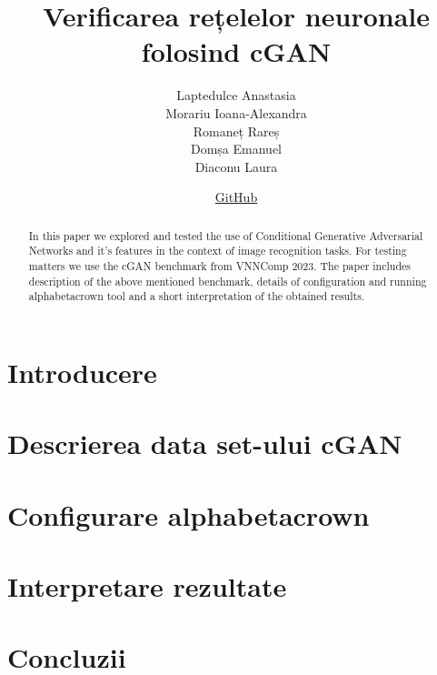\documentclass[12pt,a4paper]{report}
\title{Verificarea rețelelor neuronale folosind cGAN}
\author{Laptedulce Anastasia \\ Morariu Ioana-Alexandra \\ Romaneț Rareș  \\ Domșa Emanuel \\ Diaconu Laura}
\date{\href{https://github.com/IoanaMorariu/verificare_formala}{GitHub}}
\begin{document}
\maketitle
\begin{abstract}
\hspace{0.5 cm} In this paper we explored and tested the use of Conditional Generative Adversarial Networks and it's features in the context of image recognition tasks. For testing matters we use the cGAN benchmark from VNNComp 2023. The paper includes description of the above mentioned benchmark, details of configuration and running alpha\textunderscore beta\textunderscore crown tool and a short interpretation of the obtained results.


\end{abstract}


\section*{Introducere}


\section*{Descrierea data set-ului cGAN}


\section*{Configurare alpha\textunderscore beta\textunderscore crown}


\section*{Interpretare rezultate}


\section*{Concluzii}





\end{document}
